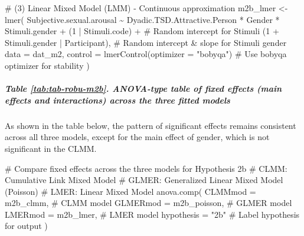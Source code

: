 \documentclass[
  bookmarksnumbered]{article}
\newenvironment{Shaded}{\begin{snugshade}}{\end{snugshade}}
\newcommand{\AttributeTok}[1]{\textcolor[rgb]{0.80,0.80,0.80}{#1}}
\newcommand{\CommentTok}[1]{\textcolor[rgb]{0.50,0.62,0.50}{#1}}
\newcommand{\DecValTok}[1]{\textcolor[rgb]{0.86,0.86,0.80}{#1}}
\newcommand{\FunctionTok}[1]{\textcolor[rgb]{0.94,0.94,0.56}{#1}}
\newcommand{\NormalTok}[1]{\textcolor[rgb]{0.80,0.80,0.80}{#1}}
\newcommand{\OtherTok}[1]{\textcolor[rgb]{0.94,0.94,0.56}{#1}}
\newcommand{\SpecialCharTok}[1]{\textcolor[rgb]{0.86,0.64,0.64}{#1}}
\newcommand{\StringTok}[1]{\textcolor[rgb]{0.80,0.58,0.58}{#1}}
\begin{document}
\begin{Shaded}
\begin{Highlighting}[]
\CommentTok{\# (3) Linear Mixed Model (LMM) {-} Continuous approximation}
\NormalTok{m2b\_lmer }\OtherTok{\textless{}{-}} \FunctionTok{lmer}\NormalTok{(}
\NormalTok{  Subjective.sexual.arousal }\SpecialCharTok{\textasciitilde{}}\NormalTok{ Dyadic.TSD.Attractive.Person }\SpecialCharTok{*}\NormalTok{ Gender }\SpecialCharTok{*}\NormalTok{ Stimuli.gender }\SpecialCharTok{+}
\NormalTok{    (}\DecValTok{1} \SpecialCharTok{|}\NormalTok{ Stimuli.code) }\SpecialCharTok{+} \CommentTok{\# Random intercept for Stimuli}
\NormalTok{    (}\DecValTok{1} \SpecialCharTok{+}\NormalTok{ Stimuli.gender }\SpecialCharTok{|}\NormalTok{ Participant), }\CommentTok{\# Random intercept \& slope for Stimuli gender}
  \AttributeTok{data =}\NormalTok{ dat\_m2,}
  \AttributeTok{control =} \FunctionTok{lmerControl}\NormalTok{(}\AttributeTok{optimizer =} \StringTok{"bobyqa"}\NormalTok{) }\CommentTok{\# Use \textquotesingle{}bobyqa\textquotesingle{} optimizer for stability}
\NormalTok{)}
\end{Highlighting}
\end{Shaded}

\subparagraph{Table \ref{tab:tab-robu-m2b}. ANOVA-type table of fixed effects (main effects and interactions) across the three fitted models}\label{table-reftabtab-robu-m2b.-anova-type-table-of-fixed-effects-main-effects-and-interactions-across-the-three-fitted-models}

As shown in the table below, the pattern of significant effects remains consistent across all three models, except for the main effect of gender, which is not significant in the CLMM.

\begin{Shaded}
\begin{Highlighting}[]
\CommentTok{\# Compare fixed effects across the three models for Hypothesis 2b}
\CommentTok{\# CLMM: Cumulative Link Mixed Model}
\CommentTok{\# GLMER: Generalized Linear Mixed Model (Poisson)}
\CommentTok{\# LMER: Linear Mixed Model}
\FunctionTok{anova.comp}\NormalTok{(}
  \AttributeTok{CLMMmod =}\NormalTok{ m2b\_clmm, }\CommentTok{\# CLMM model}
  \AttributeTok{GLMERmod =}\NormalTok{ m2b\_poisson, }\CommentTok{\# GLMER model}
  \AttributeTok{LMERmod =}\NormalTok{ m2b\_lmer, }\CommentTok{\# LMER model}
  \AttributeTok{hypothesis =} \StringTok{"2b"} \CommentTok{\# Label hypothesis for output}
\NormalTok{)}
\end{Highlighting}
\end{Shaded}
\end{document}
